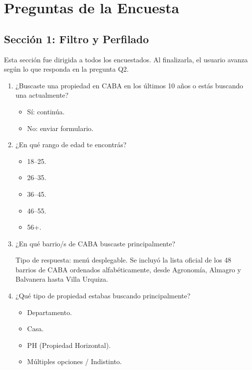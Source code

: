
\section{Preguntas de la Encuesta}

\subsection{Sección 1: Filtro y Perfilado}

Esta sección fue dirigida a todos los encuestados. Al finalizarla, el usuario avanza según lo que responda en la pregunta Q2.

\begin{enumerate}[label=\textbf{Q\arabic*:}, leftmargin=*]
\item ¿Buscaste una propiedad en CABA en los últimos 10 años o estás buscando una actualmente?

\begin{itemize}
\item Sí: continúa.
\item No: enviar formulario.
\end{itemize}

\item ¿En qué rango de edad te encontrás?

\begin{itemize}
\item 18--25.
\item 26--35.
\item 36--45.
\item 46--55.
\item 56+.
\end{itemize}

\item ¿En qué barrio/s de CABA buscaste principalmente?

Tipo de respuesta: menú desplegable. Se incluyó la lista oficial de los 48 barrios de CABA ordenados alfabéticamente, desde Agronomía, Almagro y Balvanera hasta Villa Urquiza.

\item ¿Qué tipo de propiedad estabas buscando principalmente?

\begin{itemize}
\item Departamento.
\item Casa.
\item PH (Propiedad Horizontal).
\item Múltiples opciones / Indistinto.
\end{itemize}


\end{enumerate}
